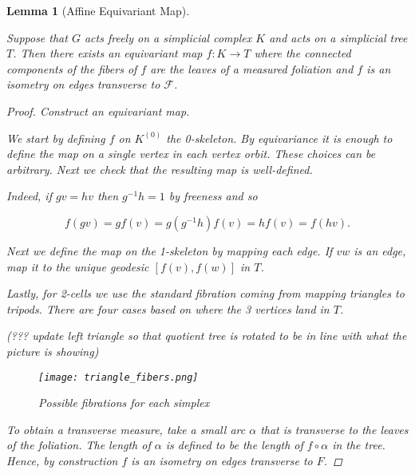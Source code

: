 \documentclass[12pt,parskip=full]{report}
\theoremstyle{plain}
\newtheorem{lem}[thm]{Lemma}
\theoremstyle{definition}
\begin{document}
\begin{lem}
    [Affine Equivariant Map]
    \label{lem:affineequivariantmap} 


    Suppose that \(G\) acts freely on a simplicial complex \(K\) and acts on a simplicial tree \(T\). Then there exists an equivariant map \(f: K \to T\) where the connected components of the fibers of \(f\) are the leaves of a measured foliation and \(f\) is an isometry on edges transverse to \(\mathscr{F}\).
    \begin{proof}
        Construct an equivariant map.

        We start by defining \(f\) on \(K^{(0)}\) the 0-skeleton. By equivariance it is enough to define the map on a single vertex in each vertex orbit. These choices can be arbitrary. Next we check that the resulting map is well-defined. 
        
        Indeed, if \(gv=hv\) then \(g^{-1} h = 1\) by freeness and so
        
        \[ f(gv) = gf(v) = g(g^{-1}h)f(v) = hf(v) = f(hv). \]
        
        Next we define the map on the 1-skeleton by mapping each edge. If \(vw\) is an edge, map it to the unique geodesic \([f(v), f(w)]\) in \(T\).
        
        Lastly, for 2-cells we use the standard fibration coming from mapping triangles to tripods. There are four cases based on where the 3 vertices land in \(T\). 
        
(??? update left triangle so that quotient tree is rotated to be in line with what the picture is showing)        
\begin{figure}[htp]
    \centering
    \texttt{[image: triangle\_fibers.png]}
    \caption{Possible fibrations for each simplex}
    \label{fig:triangle_fibers}
\end{figure}
        
        To obtain a transverse measure, take a small arc \(\alpha\) that is transverse to the leaves of the foliation. The length of \(\alpha\) is defined to be the length of \(f \circ \alpha\) in the tree. Hence, by construction \(f\) is an isometry on edges transverse to \(F\).
    \end{proof}
\end{lem}




\end{document}
